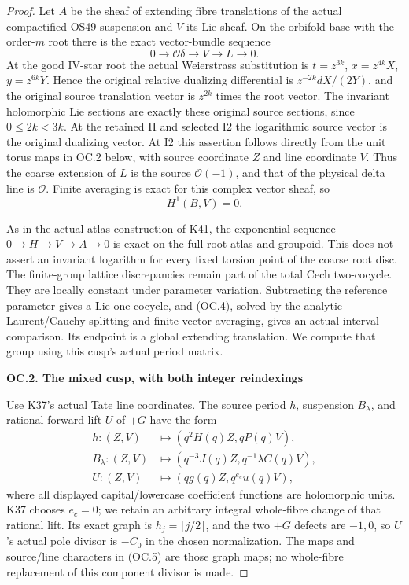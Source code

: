 \begin{proof}
Let \(A\) be the sheaf of extending fibre translations of the
actual compactified OS49 suspension and \(V\) its Lie sheaf.
On the orbifold base with the order-\(m\) root there is the exact
vector-bundle sequence
\[
 0\longrightarrow\mathcal O\delta\longrightarrow V
          \longrightarrow L\longrightarrow0.             \tag{OC.3}
\]
At the good IV-star root the actual Weierstrass substitution is
\(t=z^{3k}\), \(x=z^{4k}X\), \(y=z^{6k}Y\). Hence the
original relative dualizing differential is
\(z^{-2k}dX/(2Y)\), and the original source translation vector
is \(z^{2k}\) times the root vector. The invariant holomorphic
Lie sections are exactly these original source sections, since
\(0\le2k<3k\). At the retained II and selected I2 the
logarithmic source vector is the original dualizing vector. At I2
this assertion follows directly from the unit torus maps in OC.2
below, with source coordinate \(Z\) and line coordinate \(V\).
Thus the coarse extension of \(L\) is the source
\(\mathcal O(-1)\), and that of the physical delta line is
\(\mathcal O\). Finite averaging is exact for this complex
vector sheaf, so
\[
                         H^1(B,V)=0.                      \tag{OC.4}
\]

As in the actual atlas construction of K41, the exponential sequence
\(0\to H\to V\to A\to0\) is exact on the full root
atlas and groupoid. This does not assert an invariant logarithm for
every fixed torsion point of the coarse root disc. The finite-group
lattice discrepancies remain part of the total Cech two-cocycle.
They are locally constant under parameter variation. Subtracting the
reference parameter gives a Lie one-cocycle, and (OC.4), solved by
the analytic Laurent/Cauchy splitting and finite vector averaging,
gives an actual interval comparison. Its endpoint is a global
extending translation. We compute that group using this cusp's
actual period matrix.

\par

\medskip\noindent\textbf{OC.2. The mixed cusp, with both integer reindexings}

\par\nobreak

Use K37's actual Tate line coordinates. The source period \(h\),
suspension \(B_\lambda\), and rational forward lift \(U\)
of \(+G\) have the form
\[
 \begin{aligned}
 h:(Z,V)&\longmapsto(q^2H(q)Z,qP(q)V),\\
 B_\lambda:(Z,V)&\longmapsto(q^{-3}J(q)Z,
                                      q^{-1}\lambda C(q)V),\\
 U:(Z,V)&\longmapsto(qg(q)Z,q^{e_c}u(q)V),
 \end{aligned}                                             \tag{OC.5}
\]
where all displayed capital/lowercase coefficient functions are
holomorphic units. K37 chooses \(e_c=0\); we retain an arbitrary
integral whole-fibre change of that rational lift. Its exact graph is
\(h_j=\lceil j/2\rceil\), and the two \(+G\) defects are
\(-1,0\), so \(U\)'s actual pole divisor is \(-C_0\)
in the chosen normalization. The maps and source/line characters
in (OC.5) are those graph maps; no whole-fibre replacement of this
component divisor is made.


\end{proof}
